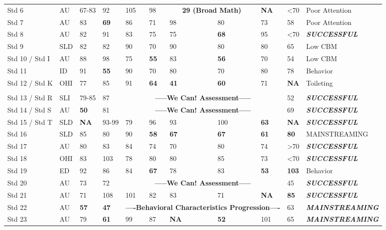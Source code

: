 \documentclass[twoside]{article}
\begin{document}
\begin{tiny}
\begin{landscape}
\begin{longtable}{p{1.5cm}p{1.5cm}p{1.5cm}p{1.5cm}p{1.75cm}p{1.75cm}p{1.75cm}p{1.75cm}p{1.75cm}p{1.75cm}p{2.5cm}@{}}
Std 6 & AU & 67-83 & 92 & 105 & 98 & \multicolumn{2}{c}{\textbf{29 (Broad Math)}} & \textbf{NA} & \textless70 & Poor Attention\\
Std 7 & AU & 83 & \textbf{69} & 86 & 71 & 98 & 80 & 73 & 58 & Poor Attention\\ 
Std 8 & AU & 82 & 91 & 83 & 75 & 75 & \textbf{68} & 95 & \textless70 & \textbf{\textit{SUCCESSFUL}}\\ 
Std 9 & SLD & 82 & 82 & 90 & 70 & 90 & 80 & 80 & 65 & Low CBM\\ 
Std 10 / Std I & AU & 88 & 98 & 75 & \textbf{55} & 83 & \textbf{56} & 70 & 54 & Low CBM\\
Std 11 & ID & 91 & \textbf{55} & 90 & 70 & 80 & 70 & 80 & 78 & Behavior\\
Std 12 / Std K & OHI & 77 & 85 & 91 & \textbf{64} & \textbf{41} & \textbf{60} & 71 & \textbf{NA} & Toileting\\
%
\hline\\
Std 13  / Std R & SLI & 79-85 & 87 & \multicolumn{5}{c}{\textbf{-----We Can! Assessment-----}} & 52 & \textbf{\textit{SUCCESSFUL}} \\
Std 14 / Std S & AU & \textbf{50}& 81 & \multicolumn{5}{c}{\textbf{-----We Can! Assessment-----}} & 69 & \textbf{\textit{SUCCESSFUL}} \\
Std 15 / Std T & SLD & \textbf{NA} & 93-99 & 79 & 96 & 93 & 100 & \textbf{63} & \textbf{NA} & \textbf{\textit{SUCCESSFUL}} \\
Std 16 & SLD &85 &80 & 90 & \textbf{58} & \textbf{67} & \textbf{67} & \textbf{61} & \textbf{80} & MAINSTREAMING \\
Std 17 & AU & 80 & 83 & 84 & 74 & 70 & 80 & 74 & \textgreater70 & \textbf{\textit{SUCCESSFUL}}\\
Std 18 & OHI & 83 & 103 & 78 & 80 & 80 & 85 & 73 & \textless70 & \textbf{\textit{SUCCESSFUL}} \\
Std 19 & ED & 92 & 86 & 84 & \textbf{67} & 78 & 83 & \textbf{53} & \textbf{103} & Behavior \\
Std 20 & AU & 73 & 72 & \multicolumn{5}{c}{\textbf{-----We Can! Assessment-----}} & 45 & \textbf{\textit{SUCCESSFUL}}\\
Std 21 & AU & 71 & 108 & 101 & 82 & 83 & 71 & \textbf{NA} & \textbf{85} & \textbf{\textit{SUCCESSFUL}} \\
Std 22 & AU & \textbf{57} & \textbf{47} & \multicolumn{5}{c}{\textbf{----Behavioral Characteristics Progression----}} & 63 & \textbf{\textit{MAINSTREAMING}} \\
Std 23 & AU & 79 & \textbf{61} & 99 & 87 & \textbf{NA} & \textbf{52} & 101 & 65 & \textbf{\textit{MAINSTREAMING}} \\

\end{longtable}
\end{landscape}
\end{tiny}
\end{document}
